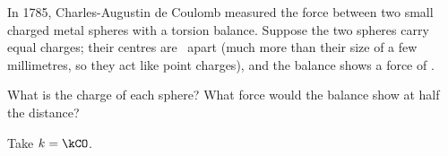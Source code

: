 In 1785, Charles-Augustin de Coulomb measured the force between two small charged metal spheres with a torsion balance. Suppose the two spheres carry equal charges; their centres are \rsO\ apart (much more than their size of a few millimetres, so they act like point charges), and the balance shows a force of \FO.

\begin{abcliste}
\abc What is the charge of each sphere?
\abc What force would the balance show at half the distance?
\end{abcliste}

Take $k = \kCO$.
